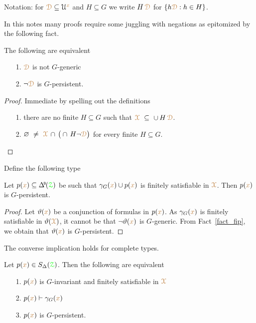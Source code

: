 Notation: for ${\color{brown}\EuScript D}\subseteq\EuScript U^{\color{brown} x}$ and $H\subseteq G$ we write $H\,{\color{brown}\EuScript D}$ for $\{h{\color{brown}\EuScript D}: h\in H\}$.

In this notes many proofs require some juggling with negations as epitomized by the following fact.

\begin{fact}\label{fact_fip}
  The following are equivalent
  \begin{itemize}
    \item[1.] ${\color{brown}\EuScript D}$ is not $G$-generic
    \item[2.] $\neg{\color{brown}\EuScript D}$ is $G$-persistent.
  \end{itemize}
\end{fact}

\begin{proof}
  Immediate by spelling out the definitions
  \begin{itemize}
    \item[1.] there are no finite $H\subseteq G$ such that ${\color{brown}\EuScript X}\ \subseteq\ \cup\, H\,{\color{brown}\EuScript D}$.
    \item[2.]  $\0\ \neq\ \mrX\,\cap\,\big(\cap\, H\neg{\mr\D}\big)$ for every finite $H\subseteq G$.\qedhere
  \end{itemize} 
\end{proof}

Define the following type


\begin{corollary}\label{corol_q_pers}
  Let $p({\mr x})\subseteq\BDelta(\grZ)$ be such that $\gamma_G({\color{brown} x})\cup p({\color{brown} x})$ is finitely satisfiable in ${\color{brown}\EuScript X}$.
  Then $p({\color{brown} x})$ is $G$-persistent.
\end{corollary}

\begin{proof}
  Let $\vartheta({\color{brown} x})$ be a conjunction of formulas in $p({\color{brown} x})$.
  As $\gamma_G({\color{brown} x})$ is finitely satisfiable in $\vartheta({\color{brown}\EuScript X})$, it cannot be that $\neg\vartheta({\color{brown} x})$ is $G$-generic.
  From Fact~\ref{fact_fip}, we obtain that $\vartheta({\color{brown} x})$ is $G$-persistent.
\end{proof}

The converse implication holds for complete types.

\begin{theorem}\label{thm_generic_invariant}
  Let $p({\color{brown} x})\in S_\Delta({\color{green}\EuScript Z})$.
  Then the following are equivalent
  \begin{itemize}
    \item[1.] $p({\color{brown} x})$ is $G$-invariant and finitely satisfiable in ${\color{brown}\EuScript X}$
    \item[2.] $p({\color{brown} x})\vdash\gamma_G({\color{brown} x})$
    \item[3.] $p({\color{brown} x})$ is $G$-persistent.
  \end{itemize}
\end{theorem}

